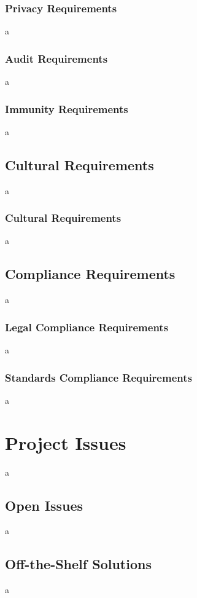 \documentclass[12pt]{article}
\begin{document}
\subsubsection{Privacy Requirements}
a

\subsubsection{Audit Requirements}
a

\subsubsection{Immunity Requirements}
a

\subsection{Cultural Requirements}
a

\subsubsection{Cultural Requirements}
a

\subsection{Compliance Requirements}
a

\subsubsection{Legal Compliance Requirements}
a

\subsubsection{Standards Compliance Requirements}
a

\section{Project Issues}
a

\subsection{Open Issues}
a

\subsection{Off-the-Shelf Solutions}
a
\end{document}
